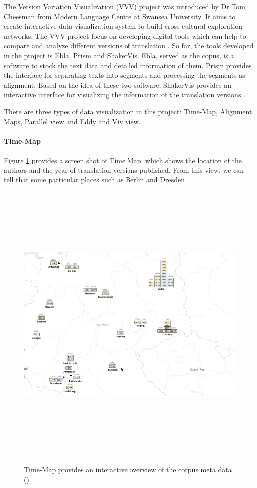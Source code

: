 The Version Variation Visualization (VVV) project was introduced by Dr Tom Cheesman from Modern Language Centre at Swansea University. It aims to create interactive data visualization system to build cross-cultural exploration networks. The VVV project focus on developing digital tools which can help to compare and analyze different versions of translation \cite{Cheesman2012}. So far, the tools developed in the project is Ebla, Prism and ShakerVis. Ebla, served as the copus, is a software to stock the text data and detailed information of them. Prism provides the interface for separating texts into segments and processing the segments as alignment. Based on the idea of these two software, ShakerVis provides an interactive interface for visualizing the information of the translation versions \cite{Geng2015}.

There are three types of data visualization in this project: Time-Map, Alignment Maps, Parallel view and Eddy and Viv view. 

\paragraph{Time-Map}
\paragraph[]{}

Figure \ref{fig:timeMap} provides a screen shot of Time Map, which shows the location of the authors and the year of translation versions published. From this view, we can tell that some particular places such as Berlin and Dresden

\begin{figure}[h] 
	\centering	
	\includegraphics[width=16cm, height=14cm]{Figs/Time-Map}\\[1ex]
	\caption{Time-Map provides an interactive overview of the corpus meta data (\cite{Cheesman2012})}
	\label{fig:timeMap}
\end{figure} 

